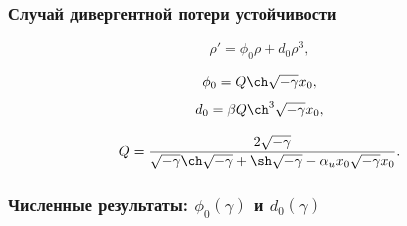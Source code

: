 \documentclass[fullscreen=true, unicode, bookmarks=false]{beamer}
\begin{document}
\begin{frame}
\frametitle{ Случай дивергентной потери устойчивости }

\begin{equation}
	\rho' = \phi_0 \rho + d_0 \rho^3,
\end{equation}

\bigskip

$$ \phi_0 = Q \ch \sqrt{-\gamma} x_0, $$
$$ d_0 = \beta Q \ch^3 \sqrt{-\gamma} x_0, $$

$$ Q = \frac{2\sqrt{-\gamma}}{\sqrt{-\gamma}\ch\sqrt{-\gamma} + \sh\sqrt{-\gamma} - \alpha_u x_0 \sqrt{-\gamma} x_0}. $$

\end{frame}

\begin{frame}
\frametitle{ Численные результаты: $ \phi_0(\gamma) $ и $ d_0(\gamma) $ }


\end{frame}
\end{document}
